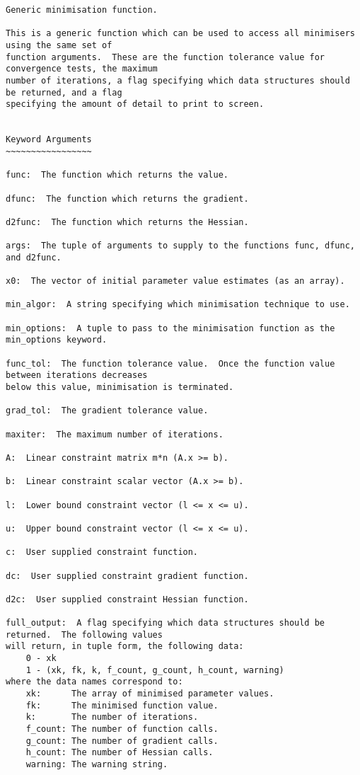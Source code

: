 \begin{verbatim}
Generic minimisation function.

This is a generic function which can be used to access all minimisers using the same set of
function arguments.  These are the function tolerance value for convergence tests, the maximum
number of iterations, a flag specifying which data structures should be returned, and a flag
specifying the amount of detail to print to screen.


Keyword Arguments
~~~~~~~~~~~~~~~~~

func:  The function which returns the value.

dfunc:  The function which returns the gradient.

d2func:  The function which returns the Hessian.

args:  The tuple of arguments to supply to the functions func, dfunc, and d2func.

x0:  The vector of initial parameter value estimates (as an array).

min_algor:  A string specifying which minimisation technique to use.

min_options:  A tuple to pass to the minimisation function as the min_options keyword.

func_tol:  The function tolerance value.  Once the function value between iterations decreases
below this value, minimisation is terminated.

grad_tol:  The gradient tolerance value.

maxiter:  The maximum number of iterations.

A:  Linear constraint matrix m*n (A.x >= b).

b:  Linear constraint scalar vector (A.x >= b).

l:  Lower bound constraint vector (l <= x <= u).

u:  Upper bound constraint vector (l <= x <= u).

c:  User supplied constraint function.

dc:  User supplied constraint gradient function.

d2c:  User supplied constraint Hessian function.

full_output:  A flag specifying which data structures should be returned.  The following values
will return, in tuple form, the following data:
    0 - xk
    1 - (xk, fk, k, f_count, g_count, h_count, warning)
where the data names correspond to:
    xk:      The array of minimised parameter values.
    fk:      The minimised function value.
    k:       The number of iterations.
    f_count: The number of function calls.
    g_count: The number of gradient calls.
    h_count: The number of Hessian calls.
    warning: The warning string.


\end{verbatim}
